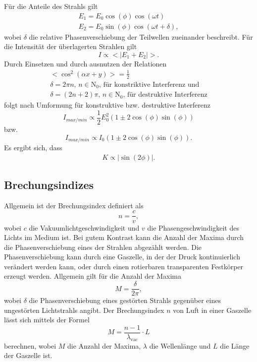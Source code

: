 Für die Anteile des Strahls gilt
\begin{gather*}
  E_1 = E_0\cos(\phi)\cos(\omega t) \\
  E_2 = E_0\sin(\phi)\cos(\omega t + \delta),
\end{gather*}
wobei $\delta$ die relative Phasenverschiebung der Teilwellen zueinander beschreibt.
Für die Intensität der überlagerten Strahlen gilt
\begin{equation*}
  I \propto <|E_1 + E_2|>.
\end{equation*}
Durch Einsetzen und durch ausnutzen der Relationen
\begin{gather*}
  <\cos^2(\alpha x + y)> = \frac{1}{2} \\
  \delta = 2\pi n , \, n\in\mathrm{N}_0,\, \text{für konstriktive Interferenz und} \\
  \delta = (2n+2)\pi,\, n\in\mathrm{N}_0,\, \text{für destruktive Interferenz}
\end{gather*}
folgt nach Umformung für konstruktive bzw. destruktive Interferenz
\begin{equation*}
  I_{max/min} \propto \frac{1}{2}E_0^2 (1 \pm 2\cos(\phi)\sin(\phi))
\end{equation*}
bzw.
\begin{equation}
  I_{max/min} \propto I_0(1 \pm 2\cos(\phi)\sin(\phi)).
\end{equation}
Es ergibt sich, dass
\begin{align*}
  K \propto |\sin(2\phi)|.
\end{align*}

\subsection{Brechungsindizes}
Allgemein ist der Brechungsindex definiert als
\begin{equation*}
  n = \frac{c}{v},
\end{equation*}
wobei $c$ die Vakuumlichtgeschwindigkeit und $v$ die Phasengeschwindigkeit des Lichts im Medium ist.
Bei gutem Kontrast kann die Anzahl der Maxima durch die Phasenverschiebung eines
der Strahlen abgezählt werden. Die Phasenverschiebung kann durch eine Gaszelle,
in der der Druck kontinuierlich verändert werden kann, oder durch einen rotierbaren
transparenten Festkörper erzeugt werden.
Allgemein gilt für die Anzahl der Maxima
\begin{equation*}
  M = \frac{\delta}{2\pi},
\end{equation*}
wobei $\delta$ die Phasenverschiebung eines gestörten Strahls gegenüber eines
ungestörten Lichtstrahls angibt.
Der Brechungsindex $n$ von Luft in einer Gaszelle lässt sich mittels der Formel
\begin{equation}
  M = \frac{n-1}{\lambda_{\text{vac}}}\cdot{L}
  \label{eqn:brechluft}
\end{equation}
berechnen,
wobei $M$ die Anzahl der Maxima, $\lambda$ die Wellenlänge und $L$ die Länge der Gaszelle ist.

